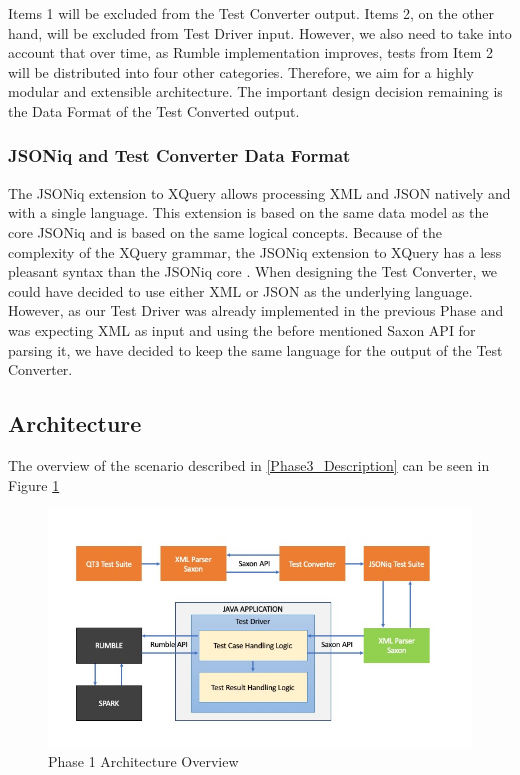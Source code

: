 Items 1 will be excluded from the Test Converter output. Items 2, on the other hand, will be excluded from Test Driver input. However, we also need to take into account that over time, as Rumble implementation improves, tests from Item 2 will be distributed into four other categories. Therefore, we aim for a highly modular and extensible architecture. The important design decision remaining is the Data Format of the Test Converted output.

\subsubsection{JSONiq and Test Converter Data Format}
The JSONiq extension to XQuery allows processing XML and JSON natively and with a single language. This extension is based on the same data model as the core JSONiq and is based on the same logical concepts. Because of the complexity of the XQuery grammar, the JSONiq extension to XQuery has a less pleasant syntax than the JSONiq core \cite{JSONIQORG}. When designing the Test Converter, we could have decided to use either XML or JSON as the underlying language. However, as our Test Driver was already implemented in the previous Phase and was expecting XML as input and using the before mentioned Saxon API for parsing it, we have decided to keep the same language for the output of the Test Converter. 

\subsection{Architecture}
The overview of the scenario described in \ref{Phase3_Description} can be seen in Figure \ref{fig:Phase3_Architecture}
\begin{figure}[h!]
	\vspace*{-5mm}
	\includegraphics[width=\linewidth]{architecture_diagram_phase_3.jpg}
	\vspace*{-15mm}
	\caption{Phase 1 Architecture Overview}
	\label{fig:Phase3_Architecture}
\end{figure}

